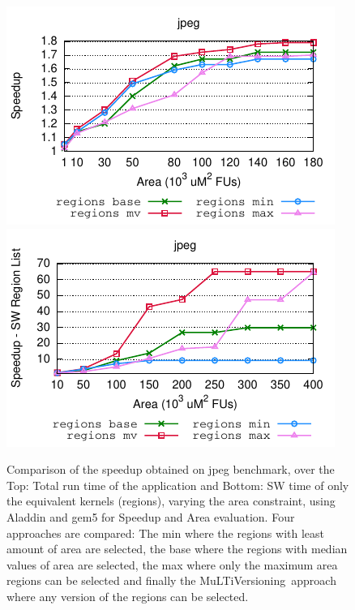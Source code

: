 \documentclass[]{usiinfthesis}
\newcommand{\multi}{MuLTiVersioning}
\begin{document}
\begin{figure}[h]
\centering
\hspace*{-1cm}
\includegraphics[width= 0.6 \linewidth]{figs/plot_O3CPU}
\hspace*{-1cm}
\includegraphics[width= 0.6 \linewidth]{figs/plot_O3CPU_SW_large}
\caption{Comparison of the speedup obtained on jpeg benchmark, over the
Top: Total run time of the application and Bottom: SW time of only the equivalent 
kernels (regions), varying the area constraint, using 
Aladdin and gem5 for Speedup and Area evaluation.
Four approaches are compared: The 
min where the regions with least amount of area are selected, the base
where the regions with median values of area are selected, the max where 
only the maximum area regions can be selected and finally the \multi\
approach where any version of the regions can be selected.
}
\label{fig:mlv_aladdin}
\end{figure}

\end{document}
